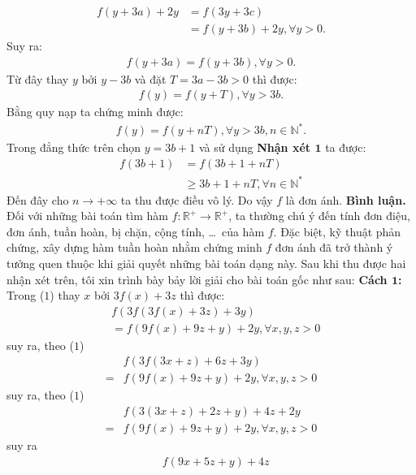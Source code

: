 \begin{multicols}{2}
	\begin{align*}
		f(y + 3a) + 2y &= f(3y + 3c) \\
		&= f(y + 3b) + 2y,\forall y > 0.
	\end{align*}
	Suy ra: 
	\begin{align*}
		f(y + 3a) = f(y + 3b),\forall y > 0.
	\end{align*}
	Từ đây thay $y$  bởi $y - 3b$  và đặt $T = 3a - 3b > 0$  thì được:
	\begin{align*}
		f(y) = f(y + T),\forall y > 3b.
	\end{align*}
	Bằng quy nạp ta chứng minh được: 
	\begin{align*}
		f(y) = f(y + nT),\forall y > 3b,n \in \mathbb{N^*}.
	\end{align*}
	Trong đẳng thức trên chọn $y = 3b + 1$  và sử dụng \textbf{\color{hoccungpi}Nhận xét $\pmb1$} ta được: 
	\begin{align*}
		f(3b + 1) &= f(3b + 1 + nT) \\
		&\ge 3b + 1 + nT,\forall n \in \mathbb{N^*}
	\end{align*}
	Đến đây cho  $n \to +\infty$ ta thu được điều vô lý. Do vậy $f$  là đơn ánh.
	\vskip 0.1cm
	\textbf{\color{hoccungpi}Bình luận.} Đối với những bài toán tìm hàm  $f: \mathbb{R^+} \to \mathbb{R^+}$, ta thường chú ý đến tính đơn điệu, đơn ánh, tuần hoàn, bị chặn, cộng tính, \ldots\, của hàm  $f$. Đặc biệt, kỹ thuật phản chứng, xây dựng hàm tuần hoàn nhằm chứng minh $f$  đơn ánh đã trở thành ý tưởng quen thuộc khi giải quyết những bài toán dạng này.
	\vskip 0.1cm 
	Sau khi thu được hai nhận xét trên, tôi xin trình bày bảy lời giải cho bài toán gốc như sau:
	\vskip 0.1cm
	\textbf{\color{hoccungpi}Cách $\pmb{1}$:}
	\vskip 0.1cm
	Trong ($1$) thay $x$  bởi $3f(x) + 3z$ thì được: 
	\begin{align*}
		&f(3f(3f(x) + 3z) + 3y) \\
		&=f(9f(x) + 9z + y) + 2y,\forall x,y,z > 0
	\end{align*}
	suy ra, theo ($1$)
	\begin{align*}
		&f(3f(3x + z) + 6z + 3y) \\
		=&f(9f(x) + 9z + y) + 2y,\forall x,y,z > 0
	\end{align*}
	suy ra, theo ($1$)
	\begin{align*}
	&f(3(3x + z) + 2z + y) + 4z + 2y \\
	= &f(9f(x) + 9z + y) + 2y,\forall x,y,z > 0
	\end{align*}
	suy ra
	\begin{align*}
		&f(9x + 5z + y) + 4z \\

\end{align*}
\end{multicols}
